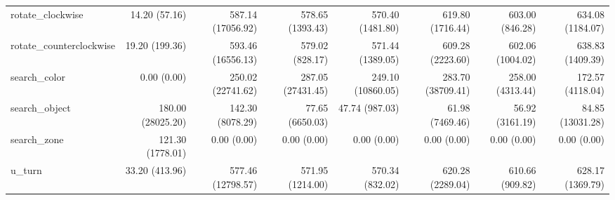 \begin{table}[t]
{\begin{tabular}{lrrrrrrr}
rotate\_clockwise & 14.20 (57.16) & 587.14 (17056.92) & 578.65 (1393.43) & 570.40 (1481.80) & 619.80 (1716.44) & 603.00 (846.28) & 634.08 (1184.07) \\
rotate\_counterclockwise & 19.20 (199.36) & 593.46 (16556.13) & 579.02 (828.17) & 571.44 (1389.05) & 609.28 (2223.60) & 602.06 (1004.02) & 638.83 (1409.39) \\
search\_color & 0.00 (0.00) & 250.02 (22741.62) & 287.05 (27431.45) & 249.10 (10860.05) & 283.70 (38709.41) & 258.00 (4313.44) & 172.57 (4118.04) \\
search\_object & 180.00 (28025.20) & 142.30 (8078.29) & 77.65 (6650.03) & 47.74 (987.03) & 61.98 (7469.46) & 56.92 (3161.19) & 84.85 (13031.28) \\
search\_zone & 121.30 (1778.01) & 0.00 (0.00) & 0.00 (0.00) & 0.00 (0.00) & 0.00 (0.00) & 0.00 (0.00) & 0.00 (0.00) \\
u\_turn & 33.20 (413.96) & 577.46 (12798.57) & 571.95 (1214.00) & 570.34 (832.02) & 620.28 (2289.04) & 610.66 (909.82) & 628.17 (1369.79) \\
\hline
\end{tabular}}
\end{table}
